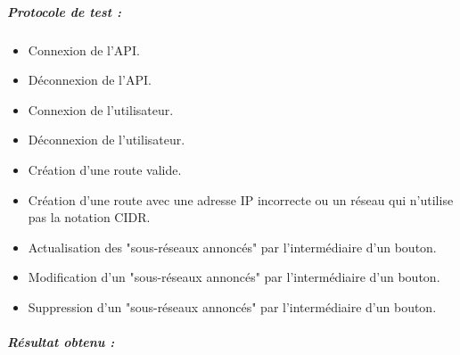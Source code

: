 \subparagraph{Protocole de test :}
\begin{itemize}
    \item Connexion de l'API.%
    \item Déconnexion de l'API.%
    \item Connexion de l'utilisateur.%
    \item Déconnexion de l'utilisateur.%
    \item Création d'une route valide.%
    \item Création d'une route avec une adresse IP incorrecte ou un réseau qui n'utilise pas la notation CIDR.%
    \item Actualisation des "sous-réseaux annoncés" par l'intermédiaire d'un bouton.%
    \item Modification d'un "sous-réseaux annoncés" par l'intermédiaire d'un bouton.%
    \item Suppression d'un "sous-réseaux annoncés" par l'intermédiaire d'un bouton.%

\end{itemize}
\subparagraph{Résultat obtenu :}
